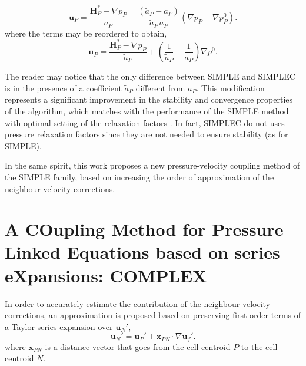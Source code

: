 \documentclass[final,3p,times,11pt,onecolumn]{myElsarticle}
\numberwithin{equation}{section}
\begin{document}
\begin{equation}
\label{eq:uCorrSIMPLEC}
\boldsymbol{u}_P 
=
\dfrac
{
\boldsymbol{H}_P^*
- 
\nabla p_P}
{a_P}
+
\dfrac
{
\left(
\tilde{a}_P
-
a_P
\right)
}
{
\tilde{a}_P\,a_P
}
\left(
\nabla p_P
-
\nabla p_P^{0}
\right).
\end{equation}
where the terms may be reordered to obtain,
\begin{equation}
\label{Eq:velocitySimplec}
\boldsymbol{u}_P 
=
\dfrac
{
\boldsymbol{H}_P^*
- 
\nabla p_P}
{\tilde{a}_P}
+
\left(
\dfrac{1}
{\tilde{a}_P}
-
\dfrac{1}
{a_P}
\right)
\nabla p^{0}.
\end{equation}


The reader may notice that the only difference between SIMPLE and SIMPLEC is in the presence of a coefficient $\tilde{a}_P$ different from $a_P$. This modification represents a significant improvement in the stability and convergence properties of the algorithm, which matches with the performance of the SIMPLE method with optimal setting of the relaxation factors \cite{miller1}. In fact, SIMPLEC do not uses pressure relaxation factors since they are not needed to ensure stability (as for SIMPLE). 

In the same spirit, this work proposes a new pressure-velocity coupling method of the SIMPLE family, based on increasing the order of approximation of the neighbour velocity corrections.

\section{A COupling Method for Pressure Linked Equations based on series eXpansions: COMPLEX}
\label{sec:COMPLEX}

In order to accurately estimate the contribution of the neighbour velocity corrections, an approximation is proposed based on preserving first order terms of a Taylor series expansion over $\boldsymbol{u}_N'$,
\begin{equation}\label{eq:uNTaylor}
\boldsymbol{u}_N' = \boldsymbol{u}_P' + \boldsymbol{x}_{PN}\cdot 
\nabla \boldsymbol{u}_f'.
\end{equation}
where $\boldsymbol{x}_{PN}$ is a distance vector that goes from the cell centroid $P$ to the cell centroid $N$.
\end{document}
